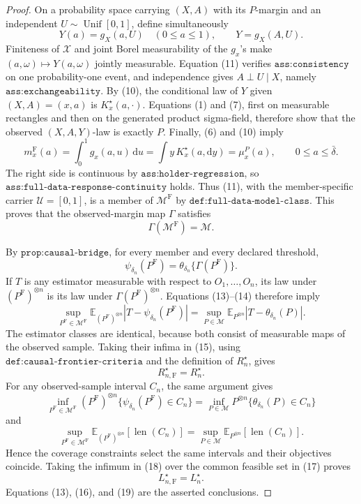 \documentclass{article}
\begin{document}
\begin{proof}
On a probability space carrying \((X,A)\) with its \(P\)-margin and an independent \(U\sim\operatorname{Unif}[0,1]\), define simultaneously
\[
 Y(a)=g_X(a,U)\quad(0\leq a\leq1),
 \qquad Y=g_X(A,U). \tag{11}
\]
Finiteness of \(\mathcal X\) and joint Borel measurability of the \(g_x\)'s make \((a,\omega)\mapsto Y(a,\omega)\) jointly measurable.  Equation (11) verifies \(\texttt{ass:consistency}\) on one probability-one event, and independence gives \(A\perp U\mid X\), namely \(\texttt{ass:exchangeability}\).  By (10), the conditional law of \(Y\) given \((X,A)=(x,a)\) is \(K_x^\star(a,\cdot)\).  Equations (1) and (7), first on measurable rectangles and then on the generated product sigma-field, therefore show that the observed \((X,A,Y)\)-law is exactly \(P\).  Finally, (6) and (10) imply
\[
 m_x^{\mathrm F}(a)
 =\int_0^1g_x(a,u)\,\mathrm du
 =\int y\,K_x^\star(a,\mathrm dy)
 =\mu_x^P(a),
 \qquad 0\leq a\leq\bar\delta. \tag{12}
\]
The right side is continuous by \(\texttt{ass:holder-regression}\), so \(\texttt{ass:full-data-response-continuity}\) holds.  Thus (11), with the member-specific carrier \(\mathcal U=[0,1]\), is a member of \(\mathcal M^{\mathrm F}\) by \(\texttt{def:full-data-model-class}\).  This proves that the observed-margin map \(\Gamma\) satisfies
\[
 \Gamma(\mathcal M^{\mathrm F})=\mathcal M. \tag{13}
\]

By \(\texttt{prop:causal-bridge}\), for every member and every declared threshold,
\[
 \psi_{\delta_n}(P^{\mathrm F})
 =\theta_{\delta_n}\{\Gamma(P^{\mathrm F})\}. \tag{14}
\]
If \(T\) is any estimator measurable with respect to \(O_1,\ldots,O_n\), its law under \((P^{\mathrm F})^{\otimes n}\) is its law under \(\Gamma(P^{\mathrm F})^{\otimes n}\).  Equations (13)--(14) therefore imply
\[
 \sup_{P^{\mathrm F}\in\mathcal M^{\mathrm F}}
 \mathbb E_{(P^{\mathrm F})^{\otimes n}}
 |T-\psi_{\delta_n}(P^{\mathrm F})|
 =\sup_{P\in\mathcal M}
 \mathbb E_{P^{\otimes n}}|T-\theta_{\delta_n}(P)|. \tag{15}
\]
The estimator classes are identical, because both consist of measurable maps of the observed sample.  Taking their infima in (15), using \(\texttt{def:causal-frontier-criteria}\) and the definition of \(R_n^\star\), gives
\[
 R_{n,\mathrm F}^\star=R_n^\star. \tag{16}
\]
For any observed-sample interval \(C_n\), the same argument gives
\[
 \inf_{P^{\mathrm F}\in\mathcal M^{\mathrm F}}
 (P^{\mathrm F})^{\otimes n}\{\psi_{\delta_n}(P^{\mathrm F})\in C_n\}
 =\inf_{P\in\mathcal M}P^{\otimes n}\{\theta_{\delta_n}(P)\in C_n\} \tag{17}
\]
and
\[
 \sup_{P^{\mathrm F}\in\mathcal M^{\mathrm F}}
 \mathbb E_{(P^{\mathrm F})^{\otimes n}}[\operatorname{len}(C_n)]
 =\sup_{P\in\mathcal M}
 \mathbb E_{P^{\otimes n}}[\operatorname{len}(C_n)]. \tag{18}
\]
Hence the coverage constraints select the same intervals and their objectives coincide.  Taking the infimum in (18) over the common feasible set in (17) proves
\[
 L_{n,\mathrm F}^\star=L_n^\star. \tag{19}
\]
Equations (13), (16), and (19) are the asserted conclusions.
\end{proof}
\end{document}
